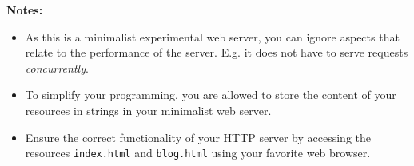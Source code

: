 \documentclass[pdftex,12pt,a4paper]{article}
\begin{document}
            \textbf{Notes:}
            \begin{itemize}
                \item As this is a minimalist experimental web server, you can
                    ignore aspects that relate to the performance of the
                    server.  E.g. it does not have to serve requests
                    \emph{concurrently}.
                \item To simplify your programming, you are allowed to store
                    the content of your resources in strings in your minimalist
                    web server.
                \item Ensure the correct functionality of your HTTP server by
                    accessing the resources \texttt{index.html} and
                    \texttt{blog.html} using your favorite web browser.
            \end{itemize}
\end{document}
